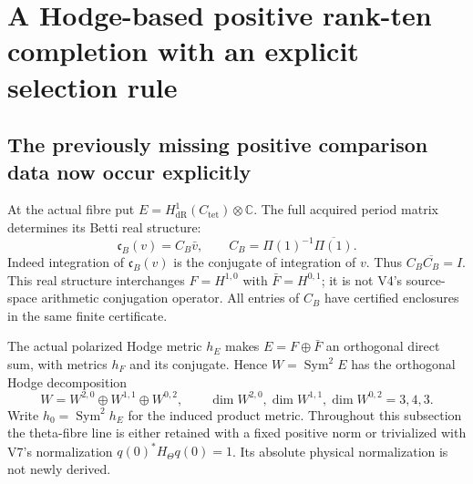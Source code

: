 \documentclass[11pt]{article}
\theoremstyle{definition}
\theoremstyle{remark}
\newcommand{\C}{\mathbb C}
\begin{document}
\section{A Hodge-based positive rank-ten completion with an explicit selection rule}
\label{sec:v8-positive-completion}

\subsection{The previously missing positive comparison data now occur explicitly}
At the actual fibre put $E=H^1_{\mathrm{dR}}(C_{\mathrm{tet}})\otimes\C$.
The full acquired period matrix determines its Betti real structure:
\begin{equation}
 \boxed{\mathfrak c_B(v)=C_B\bar v,\qquad
 C_B=\Pi(1)^{-1}\overline{\Pi(1)}.}
 \label{eq:v8-Betti-real}
\end{equation}
Indeed integration of $\mathfrak c_B(v)$ is the conjugate of integration
of $v$. Thus $C_B\overline{C_B}=I$. This real structure interchanges
$F=H^{1,0}$ with $\bar F=H^{0,1}$; it is not V4's source-space arithmetic
conjugation operator. All entries of $C_B$ have certified enclosures in the
same finite certificate.

The actual polarized Hodge metric $h_E$ makes $E=F\oplus\bar F$ an
orthogonal direct sum, with metrics $h_F$ and its conjugate. Hence
$W=\operatorname{Sym}^2E$ has the orthogonal Hodge decomposition
\begin{equation}
 W=W^{2,0}\oplus W^{1,1}\oplus W^{0,2},\qquad
 \dim W^{2,0},\dim W^{1,1},\dim W^{0,2}=3,4,3.
 \label{eq:v8-Hodge-split}
\end{equation}
Write $h_0=\operatorname{Sym}^2h_E$ for the induced product metric.
Throughout this subsection the theta-fibre line is either retained with a
fixed positive norm or trivialized with V7's normalization
$q(0)^*H_\Theta q(0)=1$. Its absolute physical normalization is not newly
derived.
\end{document}
